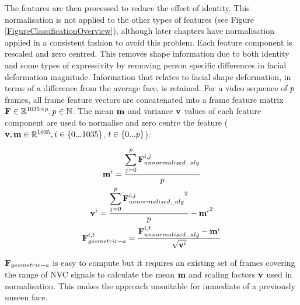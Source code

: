The features are then processed to reduce the effect of identity. This normalisation is not applied to the other types of features (see Figure \ref{FigureClassificationOverview}), although later chapters have normalisation applied in a consistent fashion to avoid this problem. Each feature component is rescaled and zero centred. This removes shape information due to both identity and some types of expressivity by removing person specific differences in facial deformation magnitude. Information that relates to facial shape deformation, in terms of a difference from the average face, is retained. For a video sequence of $p$ frames, all frame feature vectors are concatenated into a frame feature matrix $\textbf{F} \in \mathbb{R}^{1035 \times p}, p \in \mathbb{N}$. The mean $\textbf{m}$ and variance $\textbf{v}$ values of each feature component are used to normalise and zero centre the feature ($\textbf{v}, \textbf{m} \in \mathbb{R}^{1035}, i \in \{0...1035\}$, $t \in \{0...p\}$):

\begin{gather}
\label{EqnFeatureComponentMean}
\textbf{m}^i = \frac{\displaystyle\sum\limits_{j=0}^{p}{\textbf{F}_{unnormalised\_alg}^{i,j}}}{p} \\
\label{EqnFeatureComponentVar}
\textbf{v}^i = \frac{\displaystyle\sum\limits_{j=0}^{p}{{\textbf{F}_{unnormalised\_alg}^{i,j}}^2}}{p} - {\textbf{m}^i}^2 \\
\label{EqnNormaliseFeatureRange}
\textbf{F}_{geometric-a}^{i,t} = \frac{\textbf{F}_{unnormalised\_alg}^{i,t} - \textbf{m}^i}{\sqrt{\textbf{v}^i}}
\end{gather}

$\textbf{F}_{geometric-a}$ is easy to compute but it requires an existing set of frames covering the range of \ac{NVC} signals to calculate the mean $\textbf{m}$ and scaling factors $\textbf{v}$ used in normalisation. This makes the approach unsuitable for immediate \featureGeneration of a previously unseen face. 

